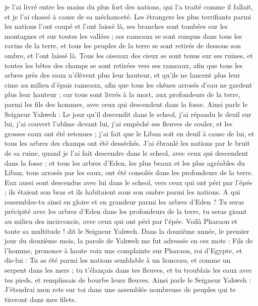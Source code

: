 \begin{multicols}{2}
je l'ai livré entre les mains du plus fort des nations, qui l'a traité comme il fallait, et je l'ai chassé à cause de sa méchanceté.
Les étrangers les plus terrifiants parmi les nations l'ont coupé et l'ont laissé là, ses branches sont tombées sur les montagnes et sur toutes les vallées ; ses rameaux se sont rompus dans tous les ravins de la terre, et tous les peuples de la terre se sont retirés de dessous son ombre, et l'ont laissé là.
Tous les oiseaux des cieux se sont tenus sur ses ruines, et toutes les bêtes des champs se sont retirées vers ses rameaux,
afin que tous les arbres près des eaux n'élèvent plus leur hauteur, et qu'ils ne lancent plus leur cime au milieu d'épais rameaux, afin que tous les chênes arrosés d'eau ne gardent plus leur hauteur ; car tous sont livrés à la mort, aux profondeurs de la terre, parmi les fils des hommes, avec ceux qui descendent dans la fosse.
Ainsi parle le Seigneur Yahweh : Le jour qu'il descendit dans le scheol, j'ai répandu le deuil sur lui, j'ai couvert l'abîme devant lui, j'ai empêché ses fleuves de couler, et les grosses eaux ont été retenues ; j'ai fait que le Liban soit en deuil à cause de lui, et tous les arbres des champs ont été desséchés.
J'ai ébranlé les nations par le bruit de sa ruine, quand je l'ai fait descendre dans le scheol, avec ceux qui descendent dans la fosse ; et tous les arbres d'Eden, les plus beaux et les plus agréables du Liban, tous arrosés par les eaux, ont été consolés dans les profondeurs de la terre.
Eux aussi sont descendus avec lui dans le scheol, vers ceux qui ont péri par l'épée ; ils étaient son bras et ils habitaient sous son ombre parmi les nations.
A qui ressembles-tu ainsi en gloire et en grandeur parmi les arbres d'Eden ? Tu seras précipité avec les arbres d'Eden dans les profondeurs de la terre, tu seras gisant au milieu des incirconcis, avec ceux qui ont péri par l'épée. Voilà Pharaon et toute sa multitude ! dit le Seigneur Yahweh.
\VerseOne{}Dans la douzième année, le premier jour du douzième mois, la parole de Yahweh me fut adressée en ces mots :
Fils de l'homme, prononce à haute voix une complainte sur Pharaon, roi d'Egypte, et dis-lui : Tu as été parmi les nations semblable à un lionceau, et comme un serpent dans les mers ; tu t'élançais dans tes fleuves, et tu troublais les eaux avec tes pieds, et remplissais de bourbe leurs fleuves.
Ainsi parle le Seigneur Yahweh : J'étendrai mon rets sur toi dans une assemblée nombreuse de peuples qui te tireront dans mes filets.

\end{multicols}
